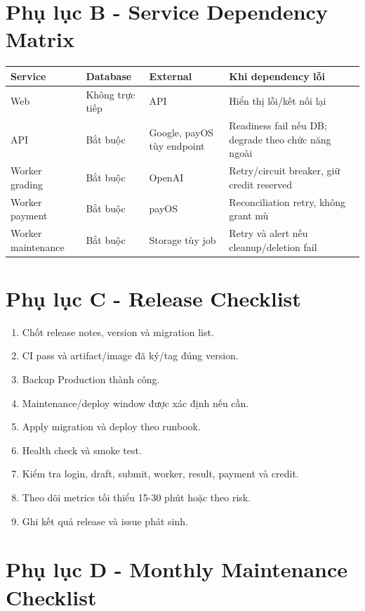 \documentclass[11pt,a4paper]{article}
\begin{document}
\section{Phụ lục B - Service Dependency Matrix}

\begin{longtable}{L{0.25\textwidth}L{0.20\textwidth}L{0.20\textwidth}L{0.27\textwidth}}
\toprule
\textbf{Service} & \textbf{Database} & \textbf{External} & \textbf{Khi dependency lỗi} \\
\midrule
Web & Không trực tiếp & API & Hiển thị lỗi/kết nối lại \\
API & Bắt buộc & Google, payOS tùy endpoint & Readiness fail nếu DB; degrade theo chức năng ngoài \\
Worker grading & Bắt buộc & OpenAI & Retry/circuit breaker, giữ credit reserved \\
Worker payment & Bắt buộc & payOS & Reconciliation retry, không grant mù \\
Worker maintenance & Bắt buộc & Storage tùy job & Retry và alert nếu cleanup/deletion fail \\
\bottomrule
\end{longtable}

\section{Phụ lục C - Release Checklist}

\begin{enumerate}
  \item Chốt release notes, version và migration list.
  \item CI pass và artifact/image đã ký/tag đúng version.
  \item Backup Production thành công.
  \item Maintenance/deploy window được xác định nếu cần.
  \item Apply migration và deploy theo runbook.
  \item Health check và smoke test.
  \item Kiểm tra login, draft, submit, worker, result, payment và credit.
  \item Theo dõi metrics tối thiểu 15-30 phút hoặc theo risk.
  \item Ghi kết quả release và issue phát sinh.
\end{enumerate}

\section{Phụ lục D - Monthly Maintenance Checklist}
\end{document}
